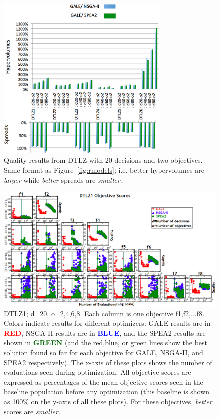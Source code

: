 \documentclass[10pt,journal,compsoc]{IEEEtran}
\newcommand{\fig}[1]{Figure~\ref{fig:#1}}
\newenvironment{changed}{\par}{\par}
\begin{document}
\begin{changed}
\begin{figure}
\includegraphics[width=3.25in]{dtlzResults1.png}
\caption{Quality results from DTLZ with 20 decisions and two objectives.
Same format as \fig{rmodels}; i.e. better hypervolumes are {\em larger} while {\em better} spreads are {\em smaller}.}\label{fig:dtlz}
\end{figure}
\begin{figure}[!b]
\includegraphics[width=6.8in]{dtlzResults2.png}
\caption{DTLZ1; d=20, o=2,4,6,8.
Each column is one objective f1,f2,...f8. Colors indicate results
for different optimizers:
GALE results are in 
\textcolor{red}{{\bf RED}},
NSGA-II results are in 
 \textcolor{blue}{{\bf BLUE}},
and the SPEA2 results are shown in 
  \textcolor{darkgreen}{{\bf GREEN}}
(and the 
red,blue, or green lines show the best solution found so far for each
objective for GALE, NSGA-II, and SPEA2 respectively). 
The x-axis of these
plots shows the number of evaluations seen during optimization.
All objective scores are expressed as percentages
of the mean objective scores seen in the baseline population before any optimization
(this baseline is shown as 100\% on the y-axis of all these plots). 
For these objectives, {\em better} scores are {\em smaller}.
}\label{fig:o2468}
\end{figure}




\end{changed}
\end{document}
